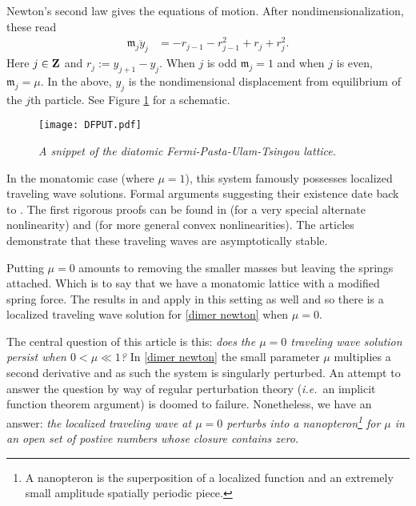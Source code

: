 \documentclass[12pt]{amsart}
\numberwithin{equation}{section}
\newcommand{\be}{\begin{equation}}
\newcommand{\ee}{\end{equation}}
\newcommand{\Z}{{\bf{Z}}}
\begin{document}
Newton's second law gives the equations of motion.
After nondimensionalization, these read
\be\begin{split}\label{dimer newton}
\mathfrak{m}_j \ddot{y}_j  &= -r_{j-1} - r_{j-1}^2 + r_j + r_{j}^2.
\end{split}\ee
Here $j \in \Z$ and 
$
r_j:=y_{j+1} - y_j.
$
When $j$ is odd
$
\mathfrak{m}_j = 
1$  and when $j$ is even,
$\mathfrak{m}_j=\mu$.
In the above, $y_j$ is the nondimensional displacement from equilibrium of the $j$th particle.
See Figure \ref{DFPUT} for a schematic.
\begin{figure}[t]
\centering
    \texttt{[image: DFPUT.pdf]}
 \caption{  \it A snippet of the diatomic Fermi-Pasta-Ulam-Tsingou lattice.
 \label{DFPUT}}
\end{figure}







In  the monatomic case (where $\mu =1$), this system
famously possesses localized traveling wave solutions.
Formal arguments suggesting their existence date back to \cite{kruskal}. The first rigorous
proofs
 can be found in \cite{toda} (for a very special alternate nonlinearity) and \cite{friesecke-wattis} (for more general convex nonlinearities).
The articles  \cite{friesecke-pego1} \cite{friesecke-pego2} \cite{friesecke-pego3} \cite{friesecke-pego4}
 demonstrate that these traveling waves are asymptotically stable.
 
Putting $\mu = 0$ 
amounts to removing the smaller masses but leaving the springs attached. 
Which is to say that we have a monatomic lattice with a modified  spring force. The results in \cite{friesecke-wattis} and \cite{friesecke-pego1} apply in this setting as well and so there is a localized traveling wave 
solution for \eqref{dimer newton} when $\mu=0$.


The central question of this article is this: {\it does the $\mu = 0$ traveling wave solution persist when  $0 < \mu \ll 1$?}
In \eqref{dimer newton} the small parameter $\mu$ multiplies a second derivative and as such the system is singularly perturbed. An attempt to answer the question by way of regular perturbation theory ({\it i.e.}~an implicit function theorem argument) is doomed to failure.
Nonetheless, we have an answer: {\it the localized traveling wave at $\mu = 0$ perturbs into a nanopteron\footnote{A nanopteron is the superposition of a localized function and an extremely small amplitude spatially periodic piece.} 
for $\mu$ in an open set of postive numbers whose closure contains zero.}
\end{document}
